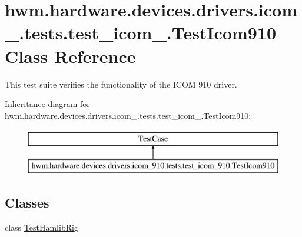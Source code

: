 \hypertarget{classhwm_1_1hardware_1_1devices_1_1drivers_1_1icom__910_1_1tests_1_1test__icom__910_1_1_test_icom910}{\section{hwm.\-hardware.\-devices.\-drivers.\-icom\-\_.\-tests.\-test\-\_\-icom\-\_.\-Test\-Icom910 Class Reference}
\label{classhwm_1_1hardware_1_1devices_1_1drivers_1_1icom__910_1_1tests_1_1test__icom__910_1_1_test_icom910}
}


This test suite verifies the functionality of the I\-C\-O\-M 910 driver.  


Inheritance diagram for hwm.\-hardware.\-devices.\-drivers.\-icom\-\_.\-tests.\-test\-\_\-icom\-\_.\-Test\-Icom910\-:\begin{figure}[H]
\begin{center}
\leavevmode
\includegraphics[height=2.000000cm]{classhwm_1_1hardware_1_1devices_1_1drivers_1_1icom__910_1_1tests_1_1test__icom__910_1_1_test_icom910}
\end{center}
\end{figure}
\subsection*{Classes}
\begin{DoxyCompactItemize}
\item 
class \hyperlink{classhwm_1_1hardware_1_1devices_1_1drivers_1_1icom__910_1_1tests_1_1test__icom__910_1_1_test_icom910_1_1_test_hamlib_rig}{Test\-Hamlib\-Rig}
\end{DoxyCompactItemize}
